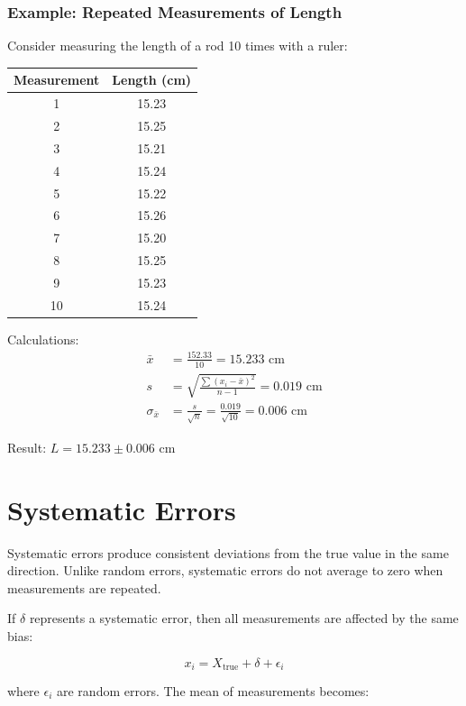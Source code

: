 \documentclass[twoside]{book}
\begin{document}
\subsubsection{Example: Repeated Measurements of Length}

Consider measuring the length of a rod 10 times with a ruler:

\begin{center}
\begin{tabular}{cc}
\toprule
Measurement & Length (cm) \\
\midrule
1 & 15.23 \\
2 & 15.25 \\
3 & 15.21 \\
4 & 15.24 \\
5 & 15.22 \\
6 & 15.26 \\
7 & 15.20 \\
8 & 15.25 \\
9 & 15.23 \\
10 & 15.24 \\
\bottomrule
\end{tabular}
\end{center}

Calculations:
\begin{align}
\bar{x} &= \frac{152.33}{10} = 15.233 \text{ cm} \\
s &= \sqrt{\frac{\sum(x_i - \bar{x})^2}{n-1}} = 0.019 \text{ cm} \\
\sigma_{\bar{x}} &= \frac{s}{\sqrt{n}} = \frac{0.019}{\sqrt{10}} = 0.006 \text{ cm}
\end{align}

Result: $L = 15.233 \pm 0.006$ cm

\section{Systematic Errors}

Systematic errors produce consistent deviations from the true value in the same direction. Unlike random errors, systematic errors do not average to zero when measurements are repeated.

If $\delta$ represents a systematic error, then all measurements are affected by the same bias:

\begin{equation*}
x_i = X_{\text{true}} + \delta + \epsilon_i
\end{equation*}

where $\epsilon_i$ are random errors. The mean of measurements becomes:
\end{document}
